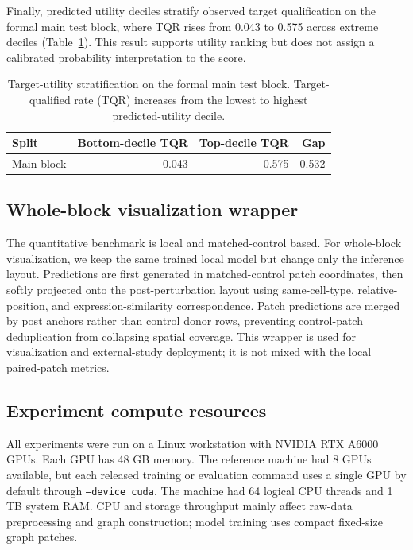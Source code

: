 \documentclass[sigconf,review,balance=false]{acmart}
\begin{document}
Finally, predicted utility deciles stratify observed target qualification on
the formal main test block, where TQR rises from 0.043 to 0.575 across extreme
deciles (Table~\ref{tab:app_selector_calibration}). This result supports
utility ranking but does not assign a calibrated probability interpretation to
the score.

\begin{table}[t]
\centering
\small
\caption{Target-utility stratification on the formal main test block.
Target-qualified rate (TQR) increases from the lowest to highest
predicted-utility decile.}
\label{tab:app_selector_calibration}
\begin{tabular}{lrrr}
\toprule
Split & Bottom-decile TQR & Top-decile TQR & Gap \\
\midrule
Main block & 0.043 & 0.575 & 0.532 \\
\bottomrule
\end{tabular}
\end{table}
\FloatBarrier

\subsection{Whole-block visualization wrapper}
\label{app:whole_block_wrapper}

The quantitative benchmark is local and matched-control based. For whole-block visualization, we keep the same trained local model but change only the inference layout. Predictions are first generated in matched-control patch coordinates, then softly projected onto the post-perturbation layout using same-cell-type, relative-position, and expression-similarity correspondence. Patch predictions are merged by post anchors rather than control donor rows, preventing control-patch deduplication from collapsing spatial coverage. This wrapper is used for visualization and external-study deployment; it is not mixed with the local paired-patch metrics.


\subsection{Experiment compute resources}
\label{app:compute_resources}

All experiments were run on a Linux workstation with NVIDIA RTX A6000 GPUs. Each GPU has 48 GB memory. The reference machine had 8 GPUs available, but each released training or evaluation command uses a single GPU by default through \texttt{--device cuda}. The machine had 64 logical CPU threads and 1 TB system RAM. CPU and storage throughput mainly affect raw-data preprocessing and graph construction; model training uses compact fixed-size graph patches.
\end{document}
